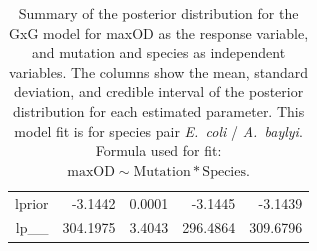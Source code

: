 \begin{table}[ht]
\begin{tabular}{rrrrr}
  lprior & -3.1442 & 0.0001 & -3.1445 & -3.1439 \\ 
  lp\_\_ & 304.1975 & 3.4043 & 296.4864 & 309.6796 \\ 
   \hline
\end{tabular}
\caption{Summary of the posterior distribution for the GxG model for maxOD as the response variable, and mutation and species as independent variables. The columns show the mean, standard deviation, and credible interval of the posterior distribution for each estimated parameter. This model fit is for species pair \textit{E.~coli} / \textit{A.~baylyi}.  Formula used for fit: $\text{maxOD} \sim \text{Mutation} * \text{Species}$.} 
\label{supptab:GxG_maxOD_EC_AB}
\end{table}



